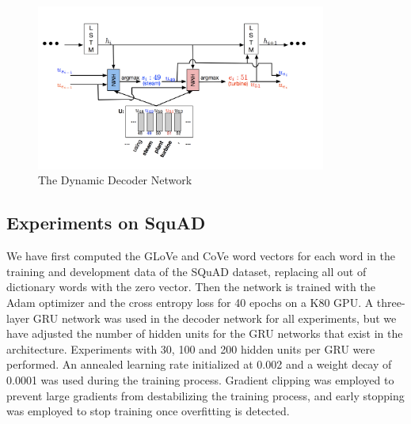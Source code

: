 \begin{figure}[h]
    \centering
    \includegraphics[width=0.85\textwidth]{images/decoder.png}
    \caption{The Dynamic Decoder Network}
    \label{im:dec}
\end{figure}

\subsection{Experiments on SquAD}

We have first computed the GLoVe and CoVe word vectors for each word in the training and development data of the SQuAD dataset, replacing all out of dictionary words with the zero vector. Then the network is trained with the Adam optimizer and the cross entropy loss for 40 epochs on a K80 GPU. A three-layer GRU network was used in the decoder network for all experiments, but we have adjusted the number of hidden units for the GRU networks that exist in the architecture. Experiments with 30, 100 and 200 hidden units per GRU were performed. An annealed learning rate initialized at 0.002 and a weight decay of 0.0001 was used during the training process. Gradient clipping was employed to prevent large gradients from destabilizing the training process, and early stopping was employed to stop training once overfitting is detected.

